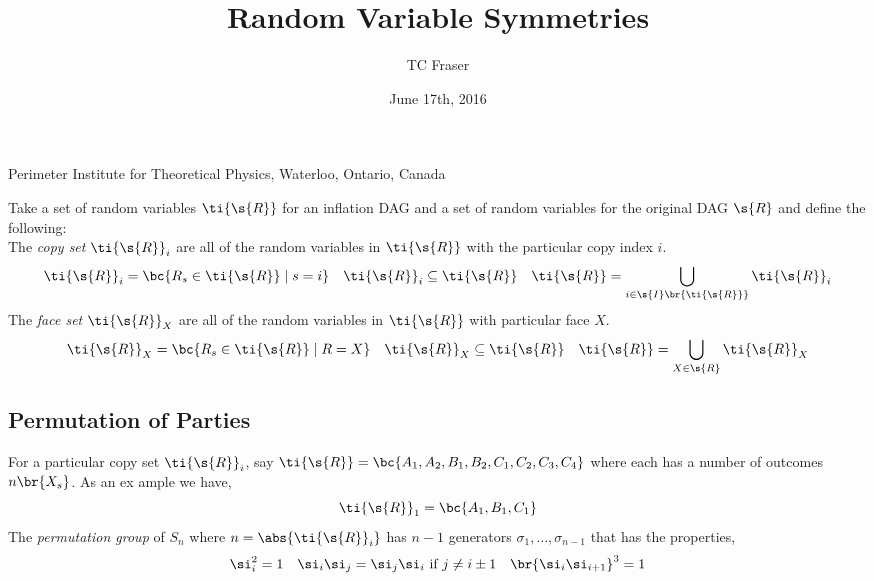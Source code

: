 \documentclass{article}
\begin{document}
    \title{Random Variable Symmetries}
    \author{TC Fraser}{Perimeter Institute for Theoretical Physics, Waterloo, Ontario, Canada}
    \date{June 17th, 2016}

    \newcommand{\irv}{\ti{\s{R}}}
    Take a set of random variables $\irv$ for an inflation DAG and a set of random variables for the original DAG $\s{R}$ and define the following:\\

    The \textit{copy set} $\irv_i$ are all of the random variables in $\irv$ with the particular copy index $i$.
    \[ \irv_i = \bc{R_s \in \irv \mid s = i} \quad \irv_i \subseteq \irv \quad \irv = \bigcup_{i \in \s{I}\br{\irv}} \irv_i \]
    The \textit{face set} $\irv_X$ are all of the random variables in $\irv$ with particular face $X$.
    \[ \irv_X = \bc{R_s \in \irv \mid R = X} \quad \irv_X \subseteq \irv \quad \irv = \bigcup_{X \in \s{R}} \irv_X \]

    \subsection*{Permutation of Parties}
    For a particular copy set $\irv_i$, say $\irv = \bc{A_1, A_2, B_1, B_2, C_1, C_2, C_3, C_4}$ where each has a number of outcomes
    $n\br{X_s}$. As an ex
    ample we have,
    \[ \irv_1 = \bc{A_1, B_1, C_1} \]
    The \textit{permutation group} of $S_n$ where $n = \abs{\irv_i}$ has $n-1$ generators $\sigma_1, \ldots, \sigma_{n-1}$ that has the properties,
    \[ \si_i^2 = 1 \quad \si_i \si_j = \si_j \si_i \text{ if } j \neq i \pm 1 \quad \br{\si_i \si_{i+1}}^3 = 1\]
\end{document}
